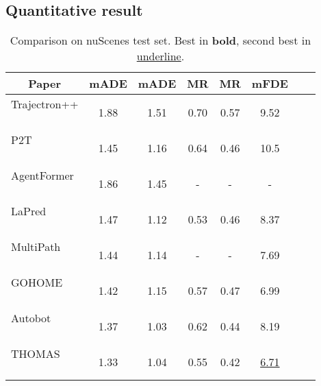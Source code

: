 \documentclass{article} \usepackage{iclr2023_conference,times}
\begin{document}
\subsection{Quantitative result}
\begin{table}[]
\begin{minipage}{.45\linewidth}
\renewcommand{\tabcolsep}{1mm}
    \renewcommand{\arraystretch}{0.3}
    \caption{Comparison on nuScenes test set. Best in \textbf{bold}, second best in \underline{underline}.}
    \label{tab:quantitative}
    \centering
    {\scriptsize
    \begin{tabular}{l|ccccccc}
        \toprule
            \multicolumn{1}{c|}{Paper}                           & mADE      & mADE   & MR        & MR     & mFDE            \\ \hline
            \rule{0pt}{9pt} \makecell[l]{Trajectron++ \\ ~\cite{salzmann2020trajectron++}}         & 1.88          & 1.51          & 0.70          & 0.57          & 9.52         \\
            \rule{0pt}{9pt} \makecell[l]{P2T \\ ~\cite{deo2020trajectory}}         & 1.45          & 1.16          & 0.64          & 0.46          & 10.5         \\
            \rule{0pt}{9pt} \makecell[l]{AgentFormer \\ ~\cite{yuan2021agentformer}}          & 1.86          & 1.45          & -          & -          & -        \\
            \rule{0pt}{9pt} \makecell[l]{LaPred \\ ~\cite{kim2021lapred}}          & 1.47          & 1.12          & 0.53          & 0.46          & 8.37         \\
            \rule{0pt}{9pt} \makecell[l]{MultiPath \\ ~\cite{chai2020multipath}}       & 1.44          & 1.14          & -          & -          & 7.69        \\
            \rule{0pt}{9pt} \makecell[l]{GOHOME \\ ~\cite{gilles2022gohome}}       & 1.42          & 1.15          & 0.57          & 0.47          & 6.99        \\
            \rule{0pt}{9pt} \makecell[l]{Autobot \\ ~\cite{girgis2021latent}}      & 1.37          & 1.03          & 0.62          & 0.44          & 8.19 \\
            \rule{0pt}{9pt} \makecell[l]{THOMAS \\ ~\cite{gilles2022thomas}}       & 1.33          & 1.04          & 0.55          & 0.42          & \underline{6.71}          \\  

\end{tabular}}
\end{minipage}
\end{table}
\end{document}
